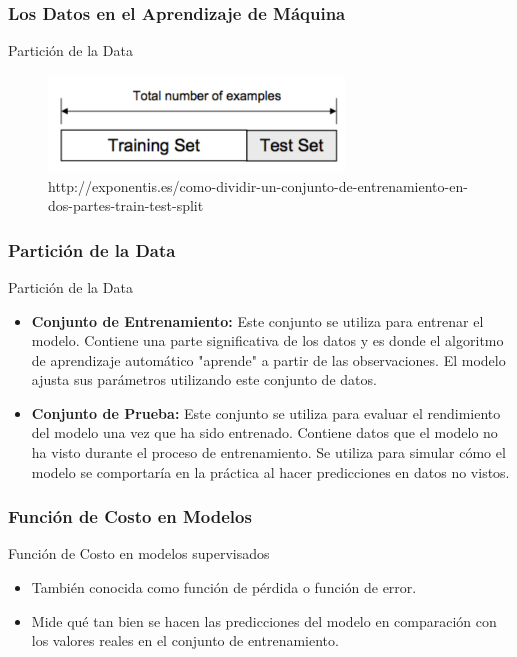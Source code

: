 \documentclass{beamer}
\begin{document}
\begin{frame}
	\frametitle{Los Datos en el Aprendizaje de Máquina}
	\begin{block}{Partición de la Data}	
		\begin{figure}
			\includegraphics[width=0.7\textwidth]{entrenamiento_prueba}
			\caption{http://exponentis.es/como-dividir-un-conjunto-de-entrenamiento-en-dos-partes-train-test-split}
		\end{figure}
	\end{block}
\end{frame}
	
	
	
\begin{frame}
	\frametitle{Partición de la Data}
			\begin{block}{Partición de la Data}	
	\begin{itemize}
	\item  \textbf{Conjunto de Entrenamiento:} 
	Este conjunto se utiliza para entrenar el modelo. Contiene una parte significativa de los datos y es donde el algoritmo de aprendizaje automático "aprende" a partir de las observaciones. El modelo ajusta sus parámetros utilizando este conjunto de datos.
	\item \textbf{ Conjunto de Prueba:} 
	Este conjunto se utiliza para evaluar el rendimiento del modelo una vez que ha sido entrenado. Contiene datos que el modelo no ha visto durante el proceso de entrenamiento. Se utiliza para simular cómo el modelo se comportaría en la práctica al hacer predicciones en datos no vistos.
		\end{itemize}
			\end{block}
\end{frame}

\begin{frame}
	\frametitle{Función de Costo en Modelos}
			\begin{block}{Función de Costo en modelos supervisados}	
	\begin{itemize}
		\item También conocida como función de pérdida o función de error.
		\item Mide qué tan bien se hacen las predicciones del modelo en comparación con los valores reales en el conjunto de entrenamiento.
	\end{itemize}
		\end{block}
\end{frame}
\end{document}
